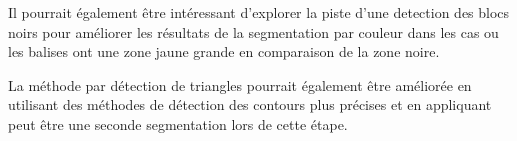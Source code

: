 \documentclass{article}
\begin{document}
Il pourrait également être intéressant d'explorer la piste d'une detection des blocs noirs pour améliorer les résultats de la segmentation par couleur dans les cas ou les balises ont une zone jaune grande en comparaison de la zone noire.

La méthode par détection de triangles pourrait également être améliorée en utilisant des méthodes de détection des contours plus précises et en appliquant peut être une seconde segmentation lors de cette étape.
\end{document}
